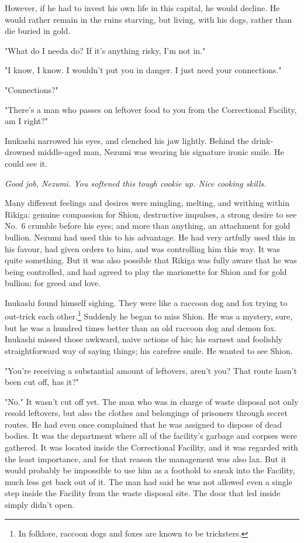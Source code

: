 However, if he had to invest his own life in this capital, he would
decline. He would rather remain in the ruins starving, but living, with
his dogs, rather than die buried in gold.

"What do I needa do? If it's anything risky, I'm not in."

"I know, I know. I wouldn't put you in danger. I just need your
connections."

"Connections?"

"There's a man who passes on leftover food to you from the Correctional
Facility, am I right?"

Inukashi narrowed his eyes, and clenched his jaw lightly. Behind the
drink-drowned middle-aged man, Nezumi was wearing his signature ironic
smile. He could see it.

\emph{Good job, Nezumi. You softened this tough cookie up. Nice cooking
skills.}

Many different feelings and desires were mingling, melting, and writhing
within Rikiga: genuine compassion for Shion, destructive impulses, a
strong desire to see No.~6 crumble before his eyes; and more than
anything, an attachment for gold bullion. Nezumi had used this to his
advantage. He had very artfully used this in his favour, had given
orders to him, and was controlling him this way. It was quite something.
But it was also possible that Rikiga was fully aware that he was being
controlled, and had agreed to play the marionette for Shion and for gold
bullion; for greed and love.

Inukashi found himself sighing. They were like a raccoon dog and
fox trying to out-trick each other.\footnote{In folklore, raccoon dogs and foxes are known to be tricksters.} Suddenly he began to miss
Shion. He was a mystery, sure, but he was a hundred times better than an
old raccoon dog and demon fox. Inukashi missed those awkward, naive
actions of his; his earnest and foolishly straightforward way of saying
things; his carefree smile. He wanted to see Shion.

"You're receiving a substantial amount of leftovers, aren't you? That
route hasn't been cut off, has it?"

"No." It wasn't cut off yet. The man who was in charge of waste disposal
not only resold leftovers, but also the clothes and belongings of
prisoners through secret routes. He had even once complained that he was
assigned to dispose of dead bodies. It was the department where all of
the facility's garbage and corpses were gathered. It was located inside
the Correctional Facility, and it was regarded with the least
importance, and for that reason the management was also lax. But it
would probably be impossible to use him as a foothold to sneak into the
Facility, much less get back out of it. The man had said he was not
allowed even a single step inside the Facility from the waste disposal
site. The door that led inside simply didn't open.

